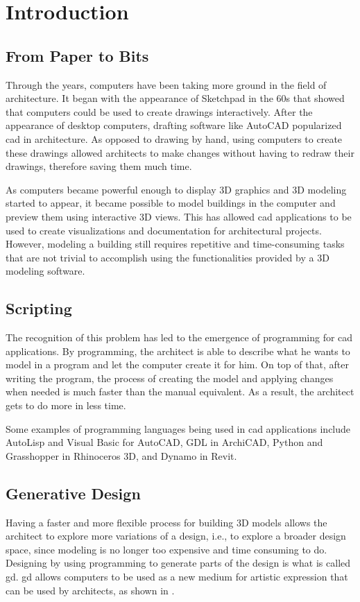 
\chapter{Introduction}
\label{chapter:introduction}

\section{From Paper to Bits}
Through the years, computers have been taking more ground in the field of architecture.
It began with the appearance of Sketchpad\cite{Sutherland:1964:SPM:800265.810742} in the 60s that showed that computers could be used to create drawings interactively.
After the appearance of desktop computers, drafting software like AutoCAD popularized \gls{cad} in architecture.
As opposed to drawing by hand, using computers to create these drawings allowed architects to make changes without having to redraw their drawings, therefore saving them much time.

As computers became powerful enough to display 3D graphics and 3D modeling started to appear, it became possible to model buildings in the computer and preview them using interactive 3D views.
This has allowed \gls{cad} applications to be used to create visualizations and documentation for architectural projects.
However, modeling a building still requires repetitive and time-consuming tasks that are not trivial to accomplish using the functionalities provided by a 3D modeling software.


\section{Scripting}
The recognition of this problem has led to the emergence of programming for \gls{cad} applications.
By programming, the architect is able to describe what he wants to model in a program and let the computer create it for him.
On top of that, after writing the program, the process of creating the model and applying changes when needed is much faster than the manual equivalent.
As a result, the architect gets to do more in less time.

Some examples of programming languages being used in \gls{cad} applications include AutoLisp and Visual Basic for AutoCAD, GDL\cite{watson2009gdl} in ArchiCAD, Python and Grasshopper in Rhinoceros 3D, and Dynamo in Revit.


\section{Generative Design}
Having a faster and more flexible process for building 3D models allows the architect to explore more variations of a design, i.e., to explore a broader design space, since modeling is no longer too expensive and time consuming to do.
Designing by using programming to generate parts of the design is what is called \gls{gd}.
\gls{gd} allows computers to be used as a new medium for artistic expression\cite{Maeda:2001:DN:559503} that can be used by architects, as shown in \cite{terzidis2003expressive}.

